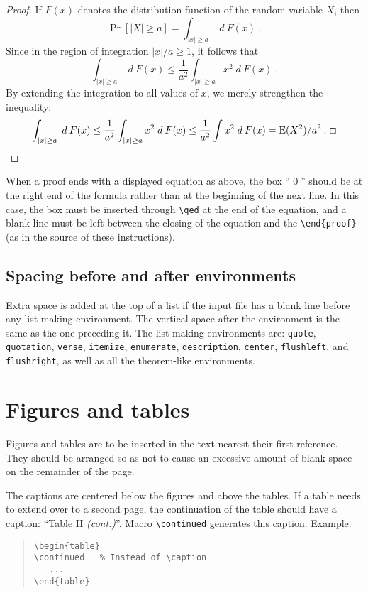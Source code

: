 \documentclass{DIKU-article}[2006/05/09]
\begin{document}
\begin{proof}
If $F(x)$ denotes the distribution function of the random variable
$X$, then
\[
\Pr[|X|\ge a] = \int_{|x|\ge a} \;d\:F(x)\;.
\]
Since in the region of integration $|x|/a\ge1$, it follows that
\[
\int_{|x|\ge a} \;d\:F(x) \le \frac{1}{a^2}
\int_{|x|\ge a} x^2\;d\:F(x)\;.
\]
By extending the integration to all values of $x$, we merely
strengthen the inequality:
\[
\int_{|x|\ge a} \;d\:F(x) \le
\frac{1}{a^2} \int_{|x|\ge a} x^2\;d\:F(x) \le
\frac{1}{a^2} \int x^2\;d\:F(x) = 
\mbox{\rm E}(X^2)/a^2\:.\; \qed
\]

\end{proof}

When a proof ends with a displayed equation as above, the box ``\qed''
should be at the right end of the formula rather than at the beginning
of the next line.  In this case, the box must be inserted through
\verb|\qed| at the end of the equation, and a blank line must be left
between the closing of the equation and the \verb|\end{proof}| (as in
the source of these instructions).

\subsection{Spacing before and after environments}

Extra space is added at the top of a list if the input file has a
blank line before any list-making environment.  The vertical space
after the environment is the same as the one preceding it.  The
list-making environments are: \texttt{quote}, \texttt{quotation},
\texttt{verse}, \texttt{itemize}, \texttt{enumerate},
\texttt{description}, \texttt{center}, \texttt{flushleft}, and
\texttt{flushright}, as well as all the theorem-like environments.

\section{Figures and tables}

Figures and tables are to be inserted in the text nearest their first
reference.  They should be arranged so as not to cause an excessive
amount of blank space on the remainder of the page.

The captions are centered below the figures and above the tables.
If a table needs to extend over to a second page, the continuation of the
table should have a caption: ``Table II \emph{(cont.)}''.
Macro \verb|\continued| generates this caption.
Example:
\begin{quote}
   \verb|\begin{table}|\\
   \verb|\continued   % Instead of \caption|\\
   \verb|   ...|\\
   \verb|\end{table}|
\end{quote}
\end{document}
